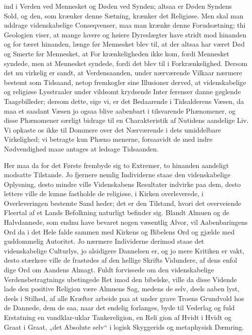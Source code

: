 \documentclass[12pt]{book}
\newcommand{\opage}[1]{\marginnote{\footnotesize\textit{[#1]}}}
\begin{document}
ind i Verden ved Mennesket og Døden ved Synden;
altsaa er Døden Syndens Sold, og den, som krænker
denne Sætning, krænker det Religiøse. Men skal man
uddrage videnskabelige Conseqvenser, maa man krænke
denne Forudsætning; thi Geologien viser, at mange lavere
\opage{70}\setcounter{footnote}{0}%
og høiere Dyreslægter have stridt mod hinanden og for\-%
tæret hinanden, længe før Mennesket blev til, at der
altsaa har været Død og Smerte før Mennesket, at For\-%
krænkeligheden ikke kom, fordi Mennesket syndede, men
at Mennesket syndede, fordi det blev til i Forkrænkelighed.
Dersom det nu virkelig er sandt, at Verdensaanden,
under nærværende Vilkaar nærmere bestemt som Tidsaand,
netop fremkogler sine Illusioner derved, at videnskabelige
og religiøse Lysstraaler under vildsomt krydsende Inter\-%
ferenser danne gøglende Taagebilleder; dersom dette, sige
vi, er det Bedaarende i Tidsalderens Væsen, da maa et
saadant Væsen jo ogsaa blive aabenbart i tilsvarende
Phænomener, og disse Phænomener særligt bidrage
til en Charakteristik af Nutidens aandelige Liv. Vi
opkaste os ikke til Dommere over det Nærværende i
dets umiddelbare Virkelighed; vi betragte kun Phæno\-%
menerne, forsaavidt de med indre Nødvendighed maae
antages at ledsage Tidsaanden.

Her maa da for det Første frembyde sig to Extremer,
to hinanden aandeligt modsatte Tilstande. Jo fjernere
nemlig Individerne staae den videnskabelige Oplysning,
desto mindre ville Videnskabens Resultater indvirke paa
dem, desto lettere ville de kunne fastholde de religiøse,
i Kirken overleverede, i Overleveringen bestemte Sand\-%
heder; det er den Tilstand, hvori det overveiende Fleertal af
et Lands Befolkning naturligt befinder sig. Blandt Almuen
og de Halvdannede, som endnu have bevaret nogen væsentlig
Alvor, vil Aabenbaringens Ord da i det Hele falde
sammen med Kirkens og Bibelens Ord og gjælde med
guddommelig Autoritet. Jo nærmere Individerne derimod
staae det videnskabelige Culturlys, jo alsidigere Dannelsen
er, og jo mere Kritiken er vakt, desto stærkere ville de
frastødes af den hellige Skrifts Vidundere, af dens enfol\-%
dige Ord om Aandens Almagt. Fuldt forvissede om den
\opage{71}\setcounter{footnote}{0}%
videnskabelige Verdensbetragtnings ubetingede Ret imod
den bibelske, ville da disse Vidende lade den positive
Religion være Almuens Sag, medens de selv, deels aaben\-%
lyst, deels i Stilhed, af alle Kræfter arbeide paa at under\-%
grave Troens Grundvold hos de Dannede, dem de saa,
naar det endelig forlanges, byde til Vederlag og fuld
Erstatning en vandklar-uklar Tankereligion, en Reli\-%
gion af Hvidt i Hvidt og Graat i Graat, „det Absolute
selv“ i logisk Skyggerids og metaphysisk Dæmring.
\end{document}
